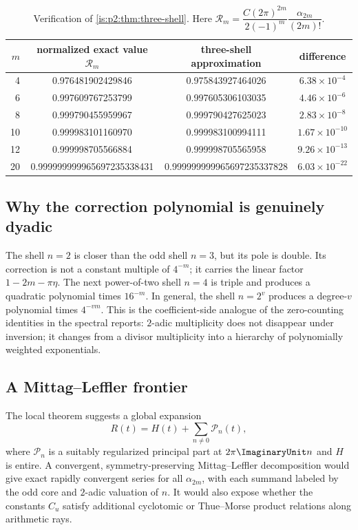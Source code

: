 \begin{table}[htbp]
\centering
\small
\begin{tabular}{@{}rccc@{}}
\toprule
$m$ & normalized exact value $\mathcal R_m$ & three-shell approximation & difference \\
\midrule
4  & 0.976481902429846 & 0.975843927464026 & $6.38\times10^{-4}$ \\
6  & 0.997609767253799 & 0.997605306103035 & $4.46\times10^{-6}$ \\
8  & 0.999790455959967 & 0.999790427625023 & $2.83\times10^{-8}$ \\
10 & 0.999983101160970 & 0.999983100994111 & $1.67\times10^{-10}$ \\
12 & 0.999998705566884 & 0.999998705565958 & $9.26\times10^{-13}$ \\
20 & 0.999999999965697235338431 & 0.999999999965697235337828 & $6.03\times10^{-22}$ \\
\bottomrule
\end{tabular}
\caption{Verification of \cref{is:p2:thm:three-shell}.  Here
$\mathcal R_m=\dfrac{C(2\pi)^{2m}}{2(-1)^m}\dfrac{\alpha_{2m}}{(2m)!}$.}
\label{is:p2:tab:three-shell}
\end{table}

\subsection{Why the correction polynomial is genuinely dyadic}

The shell $n=2$ is closer than the odd shell $n=3$, but its pole is double.  Its correction is not a
constant multiple of $4^{-m}$; it carries the linear factor $1-2m-\pi\eta$.  The next power-of-two
shell $n=4$ is triple and produces a quadratic polynomial times $16^{-m}$.  In general, the shell
$n=2^v$ produces a degree-$v$ polynomial times $4^{-vm}$.  This is the coefficient-side analogue
of the zero-counting identities in the spectral reports: $2$-adic multiplicity does not disappear
under inversion; it changes from a divisor multiplicity into a hierarchy of polynomially weighted
exponentials.

\subsection{A Mittag--Leffler frontier}

The local theorem suggests a global expansion
\begin{equation}
 R(t)=H(t)+\sum_{n\ne0}\mathcal P_n(t),
 \label{is:p2:eq:mittag-leffler-formal}
\end{equation}
where $\mathcal P_n$ is a suitably regularized principal part at $2\pi\ImaginaryUnit n$ and $H$ is entire.
A convergent, symmetry-preserving Mittag--Leffler decomposition would give exact rapidly convergent
series for all $\alpha_{2m}$, with each summand labeled by the odd core and $2$-adic valuation of
$n$.  It would also expose whether the constants $C_u$ satisfy additional cyclotomic or
Thue--Morse product relations along arithmetic rays.

